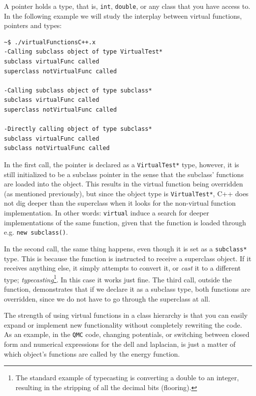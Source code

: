 A pointer holds a type, that is, \verb+int+, \verb+double+, or any class that you have access to. In the following example we will study the interplay between virtual functions, pointers and types:

\vspace{0.5 cm}


\begin{verbatim}
~$ ./virtualFunctionsC++.x 
-Calling subclass object of type VirtualTest*
subclass virtualFunc called
superclass notVirtualFunc called

-Calling subclass object of type subclass*
subclass virtualFunc called
superclass notVirtualFunc called

-Directly calling object of type subclass*
subclass virtualFunc called
subclass notVirtualFunc called
\end{verbatim}

In the first call, the pointer is declared as a \verb+VirtualTest*+ type, however, it is still initialized to be a subclass pointer in the sense that the subclass' functions are loaded into the object. This results in the virtual function being overridden (as mentioned previously), but since the object type is \verb+VirtualTest*+, C++ does not dig deeper than the superclass when it looks for the non-virtual function implementation. In other words: \verb+virtual+ induce a search for deeper implementations of the same function, given that the function is loaded through e.g. \verb+new subclass()+. 

In the second call, the same thing happens, even though it is set as a \verb+subclass*+ type. This is because the function is instructed to receive a superclass object. If it receives anything else, it simply attempts to convert it, or \textit{cast} it to a different type; \textit{typecasting}\footnote{The standard example of typecasting is converting a double to an integer, resulting in the stripping of all the decimal bits (flooring).}. In this case it works just fine. The third call, outside the function, demonstrates that if we declare it as a subclass type, both functions are overridden, since we do not have to go through the superclass at all.

The strength of using virtual functions in a class hierarchy is that you can easily expand or implement new functionality without completely rewriting the code. As an example, in the \verb+QMC+ code, changing potentials, or switching between closed form and numerical expressions for the dell and laplacian, is just a matter of which object's functions are called by the energy function.

